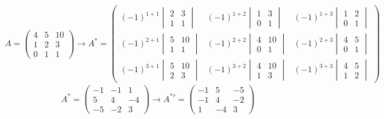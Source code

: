\documentclass[class=article,a4paper,12pt,crop=false]{standalone}
\begin{document}
\begin{equation}
    A = \begin{pmatrix}
        4 & 5 & 10 \\ 1 & 2 & 3 \\ 0 & 1 & 1
    \end{pmatrix} \rightarrow
    A^{*} = \begin{pmatrix}
        (-1)^{1 + 1} \begin{vmatrix}
            2 & 3 \\ 1 & 1
        \end{vmatrix} &
        (-1)^{1 + 2} \begin{vmatrix}
            1 & 3 \\ 0 & 1
        \end{vmatrix} &
        (-1)^{1 + 3} \begin{vmatrix}
            1 & 2 \\ 0 & 1
        \end{vmatrix} \\
        (-1)^{2 + 1} \begin{vmatrix}
            5 & 10 \\ 1 & 1
        \end{vmatrix} &
        (-1)^{2 + 2} \begin{vmatrix}
            4 & 10 \\ 0 & 1
        \end{vmatrix} &
        (-1)^{2 + 3} \begin{vmatrix}
            4 & 5 \\ 0 & 1
        \end{vmatrix} \\
        (-1)^{3 + 1} \begin{vmatrix}
            5 & 10 \\ 2 & 3
        \end{vmatrix} &
        (-1)^{3 + 2} \begin{vmatrix}
            4 & 10 \\ 1 & 3
        \end{vmatrix} &
        (-1)^{3 + 3} \begin{vmatrix}
            4 & 5 \\ 1 & 2
        \end{vmatrix}
    \end{pmatrix}
\end{equation}
\begin{eqnarray}
    A^{*} = \begin{pmatrix}
        -1 & -1 & 1 \\
        5 & 4 & -4 \\
        -5 & -2 & 3
    \end{pmatrix} \rightarrow
    A^{*\tau} = \begin{pmatrix}
        -1 & 5 & -5 \\
        -1 & 4 & -2 \\
        1 & -4 & 3
    \end{pmatrix}
\end{eqnarray}
\end{document}
